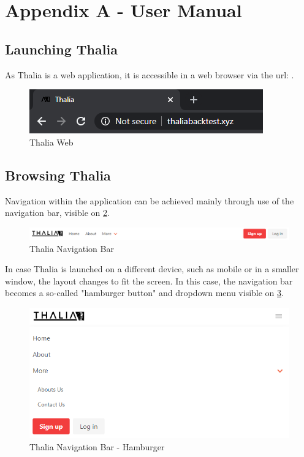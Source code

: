 \documentclass[main.tex]{subfiles}
\begin{document}
\section{Appendix A - User Manual}
\label{user_manual}

\subsection{Launching Thalia}
As Thalia is a web application, it is accessible in a web browser via the url: .

\begin{figure}[H]
   \centering
   \includegraphics[scale=0.8]{08Appendices/081User/081Pictures/thalia_domain.png}
   \caption{Thalia Web}
   \label{thalia_web}
\end{figure}

\subsection{Browsing Thalia}

Navigation within the application can be achieved mainly through use of the navigation bar, visible on \figurename{\ref{thalia_navbar}}.

\begin{figure}[H]
   \centering
   \includegraphics[width=\textwidth]{08Appendices/081User/081Pictures/navbar.png}
   \caption{Thalia Navigation Bar}
   \label{thalia_navbar}
\end{figure}

In case Thalia is launched on a different device, such as mobile or in a smaller window, the layout changes to fit the screen. In this case, the navigation bar becomes a so-called "hamburger button" and dropdown menu visible on \figurename{\ref{thalia_navbar_hamburger}}.

\begin{figure}[H]
   \centering
   \includegraphics[width=\textwidth]{08Appendices/081User/081Pictures/navbar_hamburger.png}
   \caption{Thalia Navigation Bar - Hamburger}
   \label{thalia_navbar_hamburger}
\end{figure}
\end{document}
